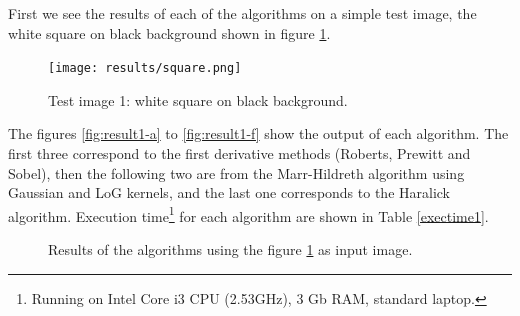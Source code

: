 \documentclass{ipol}
\numberwithin{equation}{section}
\numberwithin{table}{section}
\numberwithin{figure}{section}
\begin{document}
First we see the results of each of the algorithms on a simple test image, the white square on black background shown in figure \ref{fig:original1}. \\

\begin{figure}[h!]
	\centering
	\texttt{[image: results/square.png]}
	\caption{Test image 1: white square on black background.}
	\label{fig:original1}
\end{figure}

The figures \ref{fig:result1-a} to \ref{fig:result1-f} show the output of each algorithm. The first three correspond to the first derivative methods (Roberts, Prewitt and Sobel), then the following two are from the Marr-Hildreth algorithm using Gaussian and LoG kernels, and the last one corresponds to the Haralick algorithm. Execution time\footnote{Running on Intel Core i3 CPU (2.53GHz), 3 Gb RAM, standard laptop.} for each algorithm are shown in Table \ref{exectime1}. \\

\begin{figure}[h!]
	\centering
	\quad
	\quad

	\quad
	\quad
	\caption{Results of the algorithms using the figure \ref{fig:original1} as input image.}
	\label{fig:result1}
\end{figure}
\end{document}
